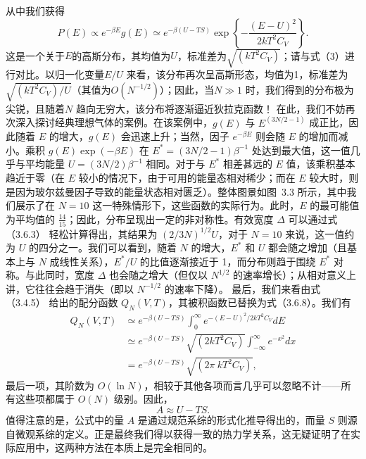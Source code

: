 从中我们获得
\begin{equation}\tag{3.5.32}\label{eq:3.5.32}
P ( E ) \propto e ^{- \beta E} g ( E ) \simeq e ^{- \beta ( U - T S )} \exp \left\{ - \frac { ( E - U ) ^{2} } { 2 k T ^{2} C _ { V } } \right\} .
\end{equation}
这是一个关于\(E\)的高斯分布，其均值为\(U\)，标准差为\(\sqrt{(kT^2C_V)}\)；请与式（3）进行对比。以归一化变量\(E/U\) 来看，该分布再次呈高斯形态，均值为1，标准差为\(\sqrt{(kT^2C_V)/U}\)（其值为\(O(N^{-1/2})\)）；因此，当\(N \gg 1\) 时，我们得到的分布极为尖锐，且随着\(N\) 趋向无穷大，该分布将逐渐逼近狄拉克函数！
在此，我们不妨再次深入探讨经典理想气体的案例。在该案例中，\(g(E)\) 与 \(E^{(3N/2-1)}\) 成正比，因此随着 \(E\) 的增大，\(g(E)\) 会迅速上升；当然，因子 \(e^{-\beta E}\) 则会随 \(E\) 的增加而减小。乘积 \(g(E)\exp(-\beta E)\) 在 \(E^*=(3N/2-1)\beta^{-1}\) 处达到最大值，这一值几乎与平均能量 \(U=(3N/2)\beta^{-1}\) 相同。对于与 \(E^*\) 相差甚远的 \(E\) 值，该乘积基本趋近于零（在 \(E\) 较小的情况下，由于可用的能量态相对稀少；而在 \(E\) 较大时，则是因为玻尔兹曼因子导致的能量状态相对匮乏）。整体图景如图~3.3 所示，其中我们展示了在 \(N=10\) 这一特殊情形下，这些函数的实际行为。此时，\(E\) 的最可能值为平均值的 \(\frac{14}{15}\)；因此，分布呈现出一定的非对称性。有效宽度 \(\Delta\) 可以通过式（3.6.3） 轻松计算得出，其结果为 \((2/3N)^{1/2}U\)，对于 \(N=10\) 来说，这一值约为 \(U\) 的四分之一。我们可以看到，随着 \(N\) 的增大，\(E^*\) 和 \(U\) 都会随之增加（且基本上与 \(N\) 成线性关系），\(E^*/U\) 的比值逐渐接近于 1，而分布则趋于围绕 \(E^*\) 对称。与此同时，宽度 \(\Delta\) 也会随之增大（但仅以 \(N^{1/2}\) 的速率增长）；从相对意义上讲，它往往会趋于消失（即以 \(N^{-1/2}\) 的速率下降）。
最后，我们来看由式（3.4.5） 给出的配分函数 \(Q_{N}(V,T)\)，其被积函数已替换为式（3.6.8）。我们有
\begin{equation}\tag{3.5.33}\label{eq:3.5.33}
\begin{aligned}Q_{N}(V,T)&\simeq e^{-\beta(U-TS)}\int_{0}^{\infty}e^{-(E-U)^{2}/2kT^{2}C_{V}}dE\\&\simeq e^{-\beta(U-TS)}\sqrt{(2kT^{2}C_{V})}\int_{-\infty}^{\infty}e^{-x^{2}}dx\\&=e^{-\beta(U-TS)}\sqrt{(2\pi\:kT^{2}C_{V})},\end{aligned}
\end{equation}
最后一项，其阶数为 \(O(\ln N)\)，相较于其他各项而言几乎可以忽略不计——所有这些项都属于 \(O(N)\) 级别。因此，
\begin{equation}\tag{3.5.34}\label{eq:3.5.34}
A \approx U - T S .
\end{equation}
值得注意的是，公式中的量 \(A\) 是通过规范系综的形式化推导得出的，而量 \(S\) 则源自微观系综的定义。正是最终我们得以获得一致的热力学关系，这无疑证明了在实际应用中，这两种方法在本质上是完全相同的。
